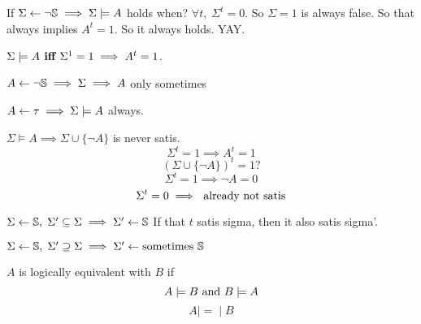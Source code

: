 \documentclass[12pt]{article}
\begin{document}

%
% 



\bboxexam
\begin{exam}
  If \(\Sigma\leftarrow\neg\mathbb S\implies\Sigma\models A\) holds when?
  \(\forall t,\;\Sigma^t=0\). So \(\Sigma=1\) is always false.
  So that always implies \(A^t=1\). So it always holds. YAY.
\end{exam}
\ebox


\bboxdefn
\begin{defn}[Models]
  \(\Sigma\models A\textbf{ iff }\Sigma^1=1\implies A^t=1\).
\end{defn}
\ebox

\bboxexam
\begin{exam}
  \(A\leftarrow\neg\mathbb S\implies\Sigma\implies A\) only sometimes
\end{exam}
\ebox

\bboxexam
\begin{exam}
  \(A\leftarrow\tau\implies\Sigma\models A\) always.
\end{exam}
\ebox

\bboxexam
\begin{exam}
  \(\Sigma\models A\implies \Sigma\cup\{\neg A\}\) is never satis.
  \[\Sigma^t=1\implies A^t=1\]
  \[(\Sigma\cup\{\neg A\})^t=1?\]
  \[\Sigma^t=1\implies\neg A=0\]
  \[\Sigma^t=0\implies\text{ already not satis}\]
\end{exam}
\ebox


\bboxexam
\begin{exam}
  \(\Sigma\leftarrow\mathbb S,\;\Sigma'\subseteq\Sigma\implies\Sigma'\leftarrow\mathbb S\)
  If that \(t\) satis sigma, then it also satis sigma'.
\end{exam}
\ebox

\bboxexam
\begin{exam}
  \(\Sigma\leftarrow\mathbb S,\;\Sigma'\supseteq\Sigma\implies\Sigma'\leftarrow\text{sometimes }\mathbb S\)
\end{exam}
\ebox

\newcommand{\logeq}{\mathbin{\mid\!=\!\mid}}

\bboxdefn
\begin{defn}
  \(A\) is logically equivalent with \(B\) if
  \[A\models B\text{ and }B\models A\]
  \[A\logeq B\]
\end{defn}
\ebox
\end{document}
